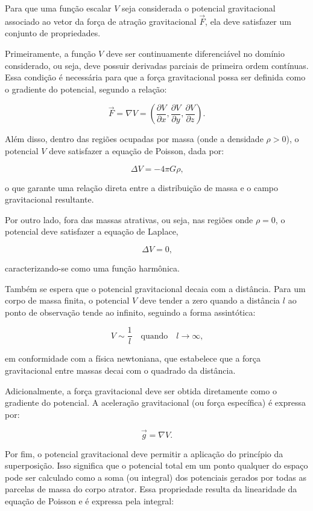 Para que uma função escalar \( V \) seja considerada o potencial gravitacional associado ao vetor da força de atração gravitacional \( \vec{F} \), ela deve satisfazer um conjunto de propriedades. 

Primeiramente, a função \( V \) deve ser continuamente diferenciável no domínio considerado, ou seja, deve possuir derivadas parciais de primeira ordem contínuas. Essa condição é necessária para que a força gravitacional possa ser definida como o gradiente do potencial, segundo a relação:

\[
\vec{F} = \nabla V = \left( \frac{\partial V}{\partial x}, \frac{\partial V}{\partial y}, \frac{\partial V}{\partial z} \right) \text{.}
\]

\noindent
Além disso, dentro das regiões ocupadas por massa (onde a densidade \( \rho > 0 \)), o potencial \( V \) deve satisfazer a equação de Poisson, dada por:

\[
\Delta V = -4\pi G \rho \text{,}
\]

\noindent
o que garante uma relação direta entre a distribuição de massa e o campo gravitacional resultante.

Por outro lado, fora das massas atrativas, ou seja, nas regiões onde \( \rho = 0 \), o potencial deve satisfazer a equação de Laplace,

\[
\Delta V = 0 \text{,}
\]

\noindent
caracterizando-se como uma função harmônica. 

Também se espera que o potencial gravitacional decaia com a distância. Para um corpo de massa finita, o potencial \( V \) deve tender a zero quando a distância \( l \) ao ponto de observação tende ao infinito, seguindo a forma assintótica:

\[
V \sim \frac{1}{l} \quad \text{quando} \quad l \to \infty \text{,}
\]

\noindent
em conformidade com a física newtoniana, que estabelece que a força gravitacional entre massas decai com o quadrado da distância.

Adicionalmente, a força gravitacional deve ser obtida diretamente como o gradiente do potencial. A aceleração gravitacional (ou força específica) é expressa por:

\[
\vec{g} = \nabla V \text{.}
\]

Por fim, o potencial gravitacional deve permitir a aplicação do princípio da superposição. Isso significa que o potencial total em um ponto qualquer do espaço pode ser calculado como a soma (ou integral) dos potenciais gerados por todas as parcelas de massa do corpo atrator. Essa propriedade resulta da linearidade da equação de Poisson e é expressa pela integral:

